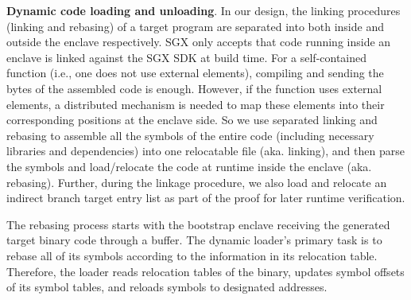 {\vspace{3pt}\noindent\textbf{Dynamic code loading and unloading}. \label{subsec-dynamicloader}
In our design, the linking procedures (linking and rebasing) of a target program are separated into both inside and outside the enclave respectively. SGX only accepts that code running inside an enclave is linked against the SGX SDK at build time. For a self-contained function (i.e., one does not use external elements), compiling and sending the bytes of the assembled code is enough. However, if the function uses external elements, a distributed mechanism is needed to map these elements into their corresponding positions at the enclave side. So we use separated linking and rebasing to assemble all the symbols of the entire code (including necessary libraries and dependencies) into one relocatable file (aka. linking), and then parse the symbols and load/relocate the code at runtime inside the enclave (aka. rebasing). Further, during the linkage procedure, we also load and relocate an indirect branch target entry list as part of the proof for later runtime verification.

The rebasing process starts with the bootstrap enclave receiving the generated target binary code through a buffer. The dynamic loader's primary task is to rebase all of its symbols according to the information in its relocation table. Therefore, the loader reads relocation tables of the binary, updates symbol offsets of its symbol tables, and reloads symbols to designated addresses. 


}
